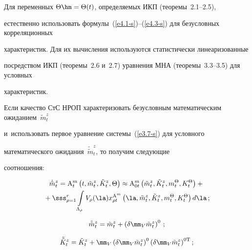Для переменных $\Theta \hm=\Theta(t)$, определяемых ИКП (теоремы~2.1--2.5), 

естественно использовать формулы~(\ref{e4.1-s})--(\ref{e4.3-s}) для безусловных корреляционных 

характеристик. Для их вычисления используются статистически линеаризованные 

посредством ИКП (теоремы~2.6 и~2.7) уравнения МНА (теоремы~3.3--3.5) для условных 

характеристик.



Если качество СтС НРОП характеризовать безусловным математическим ожиданием~$\tilde m_t^z$ 

и~использовать первое уравнение сис\-те\-мы~(\ref{e3.7-s}) для условного 

математического ожидания~$\tilde{\tilde m}_t^z$, то получим следующие 

соотношения:

\begin{multline}

\dot{\tilde m}_t^z =\mathrm{A}_t^m \left(t, \tilde m_t^z,\tilde K_t^z,\Theta\right)\approx \mathrm{A}_{0t}^m 

\left(\tilde m_t^z,\tilde K_t^z, m_t^\Theta,  K_t^\Theta\right)+{}\\

{}+\sss_{\rho=1}^r \int\limits_{\Lambda_\rho} V_\rho(\la) x_{\rho t}^{\mathrm{A}^m} 

\left(\la, \tilde m_t^z,\tilde K_t^z,m_t^\Theta, K_t^\Theta\right)d\la\,;

\label{e4.4-s}

\end{multline}

\begin{equation}

\tilde{\tilde m}_t^z =\tilde m_t^z +\left(\delta\mm_V\tilde  m_t^z\right)^0\,;

\label{e4.5-s}

\end{equation}

\begin{equation}

\tilde{\tilde K}_t^z =\tilde K_t^z +\mm_V\left(\delta\mm_V\tilde m_t^z\right)^0 

\left(\delta\mm_V\tilde m_t^z\right)^{0\mathrm{T}};

\label{e4.6-s}

\end{equation}

